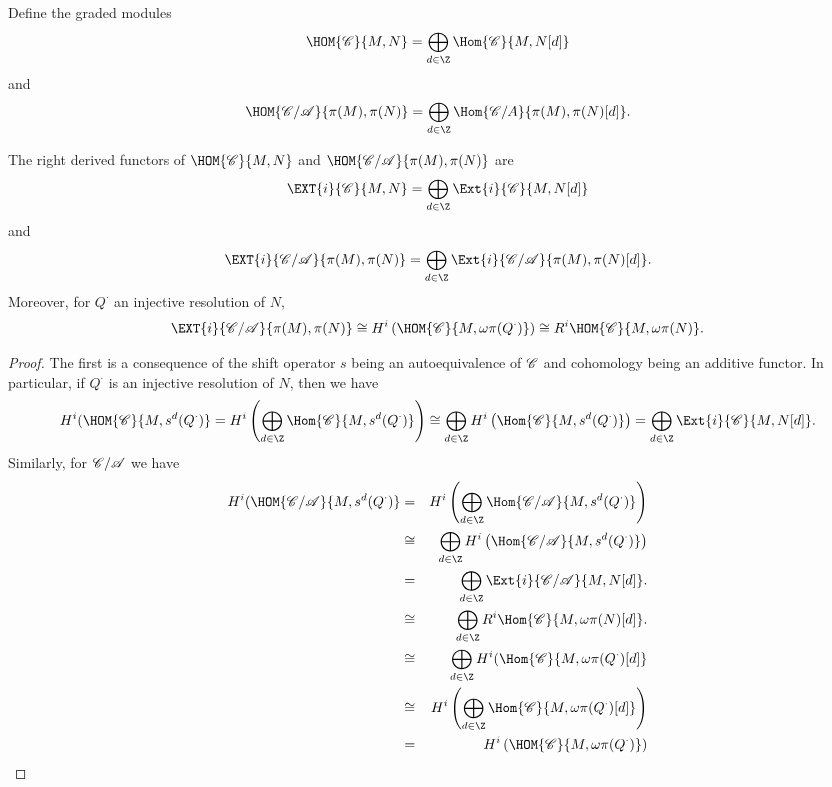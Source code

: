 \documentclass[10pt]{amsart}
\begin{document}
\begin{defn}
  Define the graded modules
  $$\HOM{\C}{M,N} = \bigoplus_{d \in \Z} \Hom{\C}{M, N[d]}$$ 
  and 
  $$\HOM{\C/\A}{\pi(M), \pi(N)} = \bigoplus_{d \in \Z} \Hom{\C/A}{\pi(M), \pi(N)[d]}.$$
\end{defn}


\begin{prop}\label{prop2}
  The right derived functors of $\HOM{\C}{M,N}$ and $\HOM{\C/\A}{\pi(M), \pi(N)}$ are
  $$\EXT{i}{\C}{M,N} = \bigoplus_{d \in \Z}\Ext{i}{\C}{M,N[d]}$$
  and
  $$\EXT{i}{\C/\A}{\pi(M),\pi(N)} = \bigoplus_{d \in \Z}\Ext{i}{\C/\A}{\pi(M),\pi(N)[d]}.$$
  Moreover, for $Q^\cdot$ an injective resolution of $N$, 
  $$\EXT{i}{\C/\A}{\pi(M), \pi(N)} \cong H^i\left(\HOM{\C}{M, \omega\pi(Q^\cdot)}\right) \cong R^i\HOM{\C}{M, \omega\pi(N)}.$$
  
  \begin{proof}
    The first is a consequence of the shift operator $s$ being an autoequivalence of $\mathscr{C}$ and cohomology being an additive functor.
    In particular, if $Q^\cdot$ is an injective resolution of $N$, then we have
    $$H^i(\HOM{\C}{M, s^d(Q^\cdot)} = H^i\left(\bigoplus_{d \in \Z}\Hom{\C}{M, s^d(Q^\cdot)}\right) \cong \bigoplus_{d \in \Z} H^i\left(\Hom{\C}{M, s^d(Q^\cdot)}\right) = \bigoplus_{d \in \Z} \Ext{i}{\C}{M, N[d]}.$$
    Similarly, for $\mathscr{C}/\mathscr{A}$ we have
    \begin{eqnarray*}
      H^i(\HOM{\C/\A}{M, s^d(Q^\cdot)} &=& H^i\left(\bigoplus_{d \in \Z}\Hom{\C/\A}{M, s^d(Q^\cdot)}\right)\\ 
      &\cong& \bigoplus_{d \in \Z} H^i\left(\Hom{\C/\A}{M, s^d(Q^\cdot)}\right)\\
      &=& \bigoplus_{d \in \Z} \Ext{i}{\C/\A}{M, N[d]}.\\
      &\cong& \bigoplus_{d \in \Z} R^i\Hom{\C}{M, \omega\pi(N)[d]}.\\
      &\cong& \bigoplus_{d \in \Z} H^i(\Hom{\C}{M, \omega\pi(Q^\cdot)[d]}\\
      &\cong& H^i\left(\bigoplus_{d \in \Z}\Hom{\C}{M, \omega\pi(Q^\cdot)[d]}\right)\\
      &=& H^i\left(\HOM{\C}{M, \omega\pi(Q^\cdot)}\right)
    \end{eqnarray*}
  \end{proof}
\end{prop}
\end{document}
